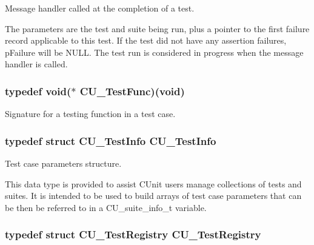 Message handler called at the completion of a test. 

The parameters are the test and suite being run, plus a pointer to the first failure record applicable to this test. If the test did not have any assertion failures, p\-Failure will be N\-U\-L\-L. The test run is considered in progress when the message handler is called. \hypertarget{group__Framework_ga5868148b642b30635b8fe7f095c5b493}{
\subsubsection[{C\-U\-\_\-\-Test\-Func}]{\setlength{\rightskip}{0pt plus 5cm}typedef void($\ast$ C\-U\-\_\-\-Test\-Func)(void)}}\label{group__Framework_ga5868148b642b30635b8fe7f095c5b493}


Signature for a testing function in a test case. 

\hypertarget{group__Framework_gad5892aef99bf82d4be23b9284531382d}{
\subsubsection[{C\-U\-\_\-\-Test\-Info}]{\setlength{\rightskip}{0pt plus 5cm}typedef struct {\bf C\-U\-\_\-\-Test\-Info}  {\bf C\-U\-\_\-\-Test\-Info}}}\label{group__Framework_gad5892aef99bf82d4be23b9284531382d}


Test case parameters structure. 

This data type is provided to assist C\-Unit users manage collections of tests and suites. It is intended to be used to build arrays of test case parameters that can be then be referred to in a C\-U\-\_\-suite\-\_\-info\-\_\-t variable. \hypertarget{group__Framework_ga9a7758811da313b88b23c6e6fdc537a0}{
\subsubsection[{C\-U\-\_\-\-Test\-Registry}]{\setlength{\rightskip}{0pt plus 5cm}typedef struct {\bf C\-U\-\_\-\-Test\-Registry}  {\bf C\-U\-\_\-\-Test\-Registry}}}\label{group__Framework_ga9a7758811da313b88b23c6e6fdc537a0}


